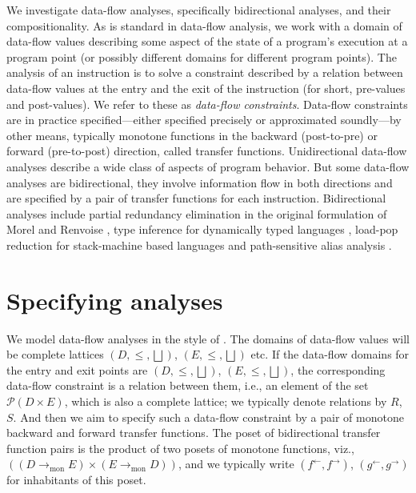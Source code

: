 \documentclass{easychair}
\theoremstyle{definition}
\newcommand{\Pow}{\mathcal{P}}
\newcommand{\tomon}{\to_{\mathrm{mon}}}
\newcommand{\ff}{{f^{\rightarrow}}}
\newcommand{\fb}{{f^{\leftarrow}}}
\newcommand{\gf}{{g^{\rightarrow}}}
\newcommand{\gb}{{g^{\leftarrow}}}
\newcommand{\bigjoin}{\bigsqcup}
\begin{document}
We investigate data-flow analyses, specifically bidirectional analyses, and their compositionality.
As is standard in data-flow analysis, we work with a domain of data-flow values describing some aspect of the state of a program's execution at a program point (or possibly different domains for different program points).
The analysis of an instruction is to solve a constraint described by a relation between data-flow values at the entry and the exit of the instruction (for short, pre-values and post-values). We refer to these as \emph{data-flow constraints}.
Data-flow constraints are in practice specified---either specified precisely or approximated soundly---by other means, typically monotone functions in the backward (post-to-pre) or forward (pre-to-post) direction, called transfer functions.
Unidirectional data-flow analyses describe a wide class of aspects of program behavior. But some data-flow analyses are bidirectional, they involve information flow in both directions and are specified by a pair of transfer functions for each instruction. Bidirectional analyses include partial redundancy elimination in the original formulation of Morel and Renvoise \cite{DBLP:journals/cacm/MorelR79,khedker_bidirectional_1999}, type inference for dynamically typed languages \cite{DBLP:journals/cl/KhedkerDM03,frade_bidirectional_2009}, load-pop reduction for stack-machine based languages \cite{stack,frade_bidirectional_2009} and path-sensitive alias analysis \cite{jaiswal_bidirectionality_2020}.

\section{Specifying analyses}

We model data-flow analyses in the style of
\cite{frade_bidirectional_2009}.  The domains of data-flow values will
be complete lattices $(D, \leq, \bigjoin)$, $(E, \leq, \bigjoin)$ etc.
If the data-flow domains for the entry and exit points are $(D, \leq, \bigjoin)$,
$(E, \leq, \bigjoin)$, the corresponding data-flow constraint is a
relation between them, i.e., an element of the set
$\Pow(D \times E)$, which is also a complete lattice; we typically
denote relations by $R$, $S$.  And then we aim to specify such a
data-flow constraint by a pair of monotone backward and forward
transfer functions. The poset of bidirectional transfer function pairs
is the product of two posets of monotone functions, viz.,
$((D \tomon E) \times (E \tomon D))$, and we typically write
$(\fb, \ff)$, $(\gb , \gf)$ for inhabitants of this poset.
\end{document}
